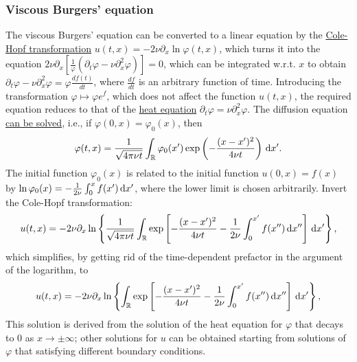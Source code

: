 \documentclass{article}
\begin{document}
\subsubsection{Viscous Burgers' equation}
The viscous Burgers' equation can be converted to a linear equation by the \href{https://en.wikipedia.org/wiki/Cole%E2%80%93Hopf_transformation}{Cole-Hopf transformation} $u(t,x) = -2\nu\partial_x\ln\varphi(t,x)$, which turns it into the equation $2\nu\partial_x\left[\frac{1}{\varphi}(\partial_t\varphi - \nu\partial_x^2\varphi)\right] = 0$, which can be integrated w.r.t. $x$ to obtain $\partial_t\varphi - \nu\partial_x^2\varphi = \varphi\frac{df(t)}{dt}$, where $\frac{df}{dt}$ is an arbitrary function of time. Introducing the transformation $\varphi\mapsto\varphi e^f$, which does not affect the function $u(t,x)$, the required equation reduces to that of the \href{https://en.wikipedia.org/wiki/Heat_equation}{heat equation} $\partial_t\varphi = \nu\partial_x^2\varphi$. The diffusion equation \href{https://en.wikipedia.org/wiki/Solving_the_heat_equation_using_Fourier_series}{can be solved}, i.e., if $\varphi(0,x) = \varphi_0(x)$, then
\begin{equation*}
	\varphi(t,x) = \frac{1}{\sqrt{4\pi\nu t}}\int_\mathbb{R} \varphi_0(x')\exp\left(-\frac{(x - x')^2}{4\nu t}\right)\,{\rm d}x'.
\end{equation*}
The initial function $\varphi_0(x)$ is related to the initial function $u(0,x) = f(x)$ by $\ln\varphi_0(x) = -\frac{1}{2\nu}\int_0^x f(x')\,{\rm d}x'$, where the lower limit is chosen arbitrarily. Invert the Cole-Hopf transformation:
\begin{equation*}
	u(t,x) = -2\nu\partial_x\ln\left\{\frac{1}{\sqrt{4\pi\nu t}}\int_\mathbb{R} \exp\left[-\frac{(x - x')^2}{4\nu t} - \frac{1}{2\nu}\int_0^{x'} f(x'')\,{\rm d}x''\right]\,{\rm d}x'\right\},
\end{equation*}
which simplifies, by getting rid of the time-dependent prefactor in the argument of the logarithm, to 
\begin{equation*}
	u(t,x) = -2\nu\partial_x\ln\left\{\int_\mathbb{R} \exp\left[-\frac{(x - x')^2}{4\nu t} - \frac{1}{2\nu}\int_0^{x'} f(x'')\,{\rm d}x''\right]\,{\rm d}x'\right\},
\end{equation*}
This solution is derived from the solution of the heat equation for $\varphi$ that decays to 0 as $x\to\pm\infty$; other solutions for $u$ can be obtained starting from solutions of $\varphi$ that satisfying different boundary conditions.
\end{document}
